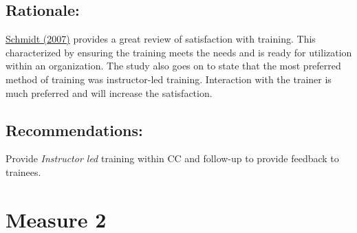 \documentclass[]{article}
\begin{document}
\subsection{\texorpdfstring{\textbf{Rationale}:}{Rationale:}}\label{rationale}

\href{https://onlinelibrary.wiley.com/doi/pdf/10.1002/hrdq.1216}{Schmidt
(2007)} provides a great review of satisfaction with training. This
characterized by ensuring the training meets the needs and is ready for
utilization within an organization. The study also goes on to state that
the most preferred method of training was instructor-led training.
Interaction with the trainer is much preferred and will increase the
satisfaction.

\subsection{\texorpdfstring{\textbf{Recommendations}:}{Recommendations:}}\label{recommendations}

Provide \emph{Instructor led} training within CC and follow-up to
provide feedback to trainees.

\section{Measure 2}\label{measure-2}
\end{document}
